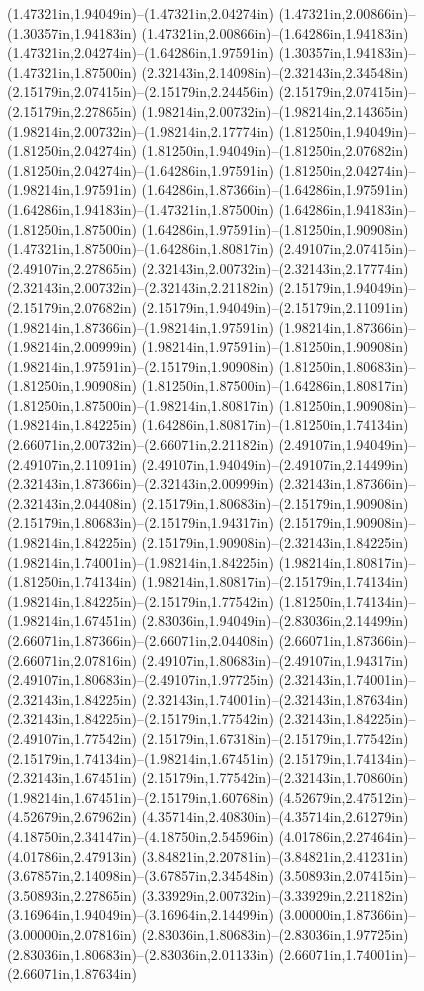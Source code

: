 (1.47321in,1.94049in)--(1.47321in,2.04274in) (1.47321in,2.00866in)--(1.30357in,1.94183in) (1.47321in,2.00866in)--(1.64286in,1.94183in) (1.47321in,2.04274in)--(1.64286in,1.97591in) (1.30357in,1.94183in)--(1.47321in,1.87500in) (2.32143in,2.14098in)--(2.32143in,2.34548in) (2.15179in,2.07415in)--(2.15179in,2.24456in) (2.15179in,2.07415in)--(2.15179in,2.27865in) (1.98214in,2.00732in)--(1.98214in,2.14365in) (1.98214in,2.00732in)--(1.98214in,2.17774in) (1.81250in,1.94049in)--(1.81250in,2.04274in) (1.81250in,1.94049in)--(1.81250in,2.07682in) (1.81250in,2.04274in)--(1.64286in,1.97591in) (1.81250in,2.04274in)--(1.98214in,1.97591in) (1.64286in,1.87366in)--(1.64286in,1.97591in) (1.64286in,1.94183in)--(1.47321in,1.87500in) (1.64286in,1.94183in)--(1.81250in,1.87500in) (1.64286in,1.97591in)--(1.81250in,1.90908in) (1.47321in,1.87500in)--(1.64286in,1.80817in) (2.49107in,2.07415in)--(2.49107in,2.27865in) (2.32143in,2.00732in)--(2.32143in,2.17774in) (2.32143in,2.00732in)--(2.32143in,2.21182in) (2.15179in,1.94049in)--(2.15179in,2.07682in) (2.15179in,1.94049in)--(2.15179in,2.11091in) (1.98214in,1.87366in)--(1.98214in,1.97591in) (1.98214in,1.87366in)--(1.98214in,2.00999in) (1.98214in,1.97591in)--(1.81250in,1.90908in) (1.98214in,1.97591in)--(2.15179in,1.90908in) (1.81250in,1.80683in)--(1.81250in,1.90908in) (1.81250in,1.87500in)--(1.64286in,1.80817in) (1.81250in,1.87500in)--(1.98214in,1.80817in) (1.81250in,1.90908in)--(1.98214in,1.84225in) (1.64286in,1.80817in)--(1.81250in,1.74134in) (2.66071in,2.00732in)--(2.66071in,2.21182in) (2.49107in,1.94049in)--(2.49107in,2.11091in) (2.49107in,1.94049in)--(2.49107in,2.14499in) (2.32143in,1.87366in)--(2.32143in,2.00999in) (2.32143in,1.87366in)--(2.32143in,2.04408in) (2.15179in,1.80683in)--(2.15179in,1.90908in) (2.15179in,1.80683in)--(2.15179in,1.94317in) (2.15179in,1.90908in)--(1.98214in,1.84225in) (2.15179in,1.90908in)--(2.32143in,1.84225in) (1.98214in,1.74001in)--(1.98214in,1.84225in) (1.98214in,1.80817in)--(1.81250in,1.74134in) (1.98214in,1.80817in)--(2.15179in,1.74134in) (1.98214in,1.84225in)--(2.15179in,1.77542in) (1.81250in,1.74134in)--(1.98214in,1.67451in) (2.83036in,1.94049in)--(2.83036in,2.14499in) (2.66071in,1.87366in)--(2.66071in,2.04408in) (2.66071in,1.87366in)--(2.66071in,2.07816in) (2.49107in,1.80683in)--(2.49107in,1.94317in) (2.49107in,1.80683in)--(2.49107in,1.97725in) (2.32143in,1.74001in)--(2.32143in,1.84225in) (2.32143in,1.74001in)--(2.32143in,1.87634in) (2.32143in,1.84225in)--(2.15179in,1.77542in) (2.32143in,1.84225in)--(2.49107in,1.77542in) (2.15179in,1.67318in)--(2.15179in,1.77542in) (2.15179in,1.74134in)--(1.98214in,1.67451in) (2.15179in,1.74134in)--(2.32143in,1.67451in) (2.15179in,1.77542in)--(2.32143in,1.70860in) (1.98214in,1.67451in)--(2.15179in,1.60768in) (4.52679in,2.47512in)--(4.52679in,2.67962in) (4.35714in,2.40830in)--(4.35714in,2.61279in) (4.18750in,2.34147in)--(4.18750in,2.54596in) (4.01786in,2.27464in)--(4.01786in,2.47913in) (3.84821in,2.20781in)--(3.84821in,2.41231in) (3.67857in,2.14098in)--(3.67857in,2.34548in) (3.50893in,2.07415in)--(3.50893in,2.27865in) (3.33929in,2.00732in)--(3.33929in,2.21182in) (3.16964in,1.94049in)--(3.16964in,2.14499in) (3.00000in,1.87366in)--(3.00000in,2.07816in) (2.83036in,1.80683in)--(2.83036in,1.97725in) (2.83036in,1.80683in)--(2.83036in,2.01133in) (2.66071in,1.74001in)--(2.66071in,1.87634in) 